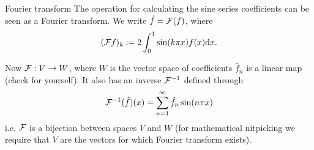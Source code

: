 \begin{frame}{Fourier transform}
	The operation for calculating the sine series coefficients can be seen as a \alert{Fourier transform}. We write $ \hat{f} = \mathcal{F}(f) $, where 
	\begin{equation}\label{eq:fourier_transform}
		(\mathcal{F} f)_k := 2 \int_{0}^{1} \sin(k\pi x) f(x) \mathrm{d} x.
	\end{equation}

	Now $ \mathcal{F}: V \to W $, where $ W $ is the vector space of coefficients $ \hat{f}_n $ is a linear map (check for yourself). It also has an inverse $ \mathcal{F}^{-1} $ defined through
	\[ \mathcal{F}^{-1}(\hat{f})(x) = \sum_{n=1}^{\infty} \hat{f}_n \sin(n\pi x) \]
	i.e. $ \mathcal{F} $ is a bijection between spaces $ V $ and $ W $ (for mathematical nitpicking we require that $ V $ are the vectors for which Fourier transform exists).
	
\end{frame}




